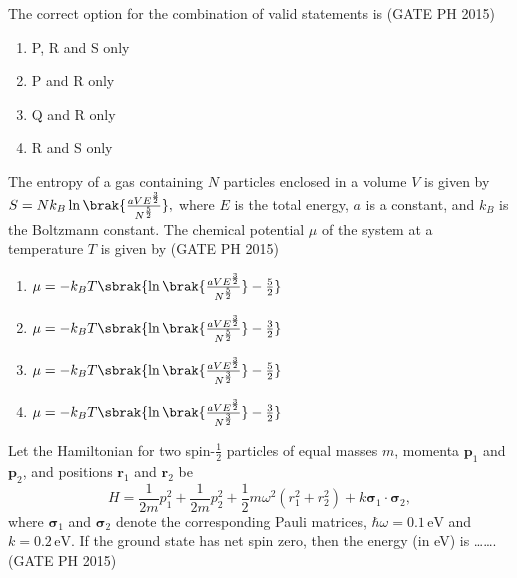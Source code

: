 The correct option for the combination of valid statements is \hfill (GATE PH 2015)
\begin{multicols}{4}
    \begin{enumerate}
        \item P, R and S only
        \item P and R only
        \item Q and R only
        \item R and S only
    \end{enumerate}
\end{multicols}

\item The entropy of a gas containing $N$ particles enclosed in a volume $V$ is given by $ S = N k_B \ln \brak{ \frac{a V E^{\frac{3}{2}}}{N^{\frac{5}{2}}} }, $ where $E$ is the total energy, $a$ is a constant, and $k_B$ is the Boltzmann constant. The chemical potential $\mu$ of the system at a temperature $T$ is given by \hfill (GATE PH 2015)

\begin{multicols}{2}
    \begin{enumerate}
        \item $\mu = -k_B T \sbrak{ \ln \brak{ \frac{a V E^{\frac{3}{2}}}{N^{\frac{5}{2}}} } - \frac{5}{2} }$
        \item $\mu = -k_B T \sbrak{ \ln \brak{ \frac{a V E^{\frac{3}{2}}}{N^{\frac{5}{2}}} } - \frac{3}{2} }$
    
        \item $\mu = -k_B T \sbrak{ \ln \brak{ \frac{a V E^{\frac{3}{2}}}{N^{\frac{3}{2}}} } - \frac{5}{2} }$
        \item $\mu = -k_B T \sbrak{ \ln \brak{ \frac{a V E^{\frac{3}{2}}}{N^{\frac{3}{2}}} } - \frac{3}{2} }$
    \end{enumerate}
\end{multicols}

\item  Let the Hamiltonian for two spin-$\frac{1}{2}$ particles of equal masses $m$, momenta $\bm{p}_1$ and $\bm{p}_2$, and positions $\bm{r}_1$ and $\bm{r}_2$ be 
$$ H = \frac{1}{2m} p_1^2 + \frac{1}{2m} p_2^2 + \frac{1}{2} m \omega^2 (r_1^2 + r_2^2) + k \bm{\sigma}_1 \cdot \bm{\sigma}_2, $$
where $\bm{\sigma}_1$ and $\bm{\sigma}_2$ denote the corresponding Pauli matrices, $\hbar \omega = 0.1 \, \text{eV}$ and $k = 0.2 \, \text{eV}$. If the ground state has net spin zero, then the energy (in eV) is \ldots\ldots. \hfill (GATE PH 2015)

